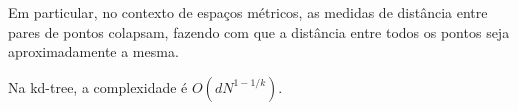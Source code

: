 Em particular, no contexto de espaços métricos, as medidas de distância entre pares de pontos colapsam, fazendo com que a distância entre todos os pontos seja aproximadamente a mesma. 

Na kd-tree, a complexidade é
$O(d N^{1 - 1/k})$\cite{worstcase:lee1977}.


\cite{searching:navarro2002,searching:chavez2001}

\subsection{}

\printbibliography